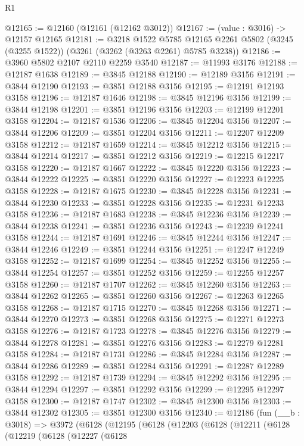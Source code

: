 \begin{lexlean}{R1}
\begin{coremodule}
@12165 := @12160 (@12161 (@12162 @3012))
@12167 := (value : @3016) -> @12157 @12165
@12181 := @3218
    @1522
    @5785
    @12165
    @2261
    @5802
    (@3245 (@3255 @1522))
    (@3261 (@3262 (@3263 @2261) @5785 @3238))
@12186 := @3960 @5802 @2107 @2110 @2259 @3540
@12187 := @11993 @3176
@12188 := @12187 @1638
@12189 := @3845 @12188
@12190 := @12189 @3156
@12191 := @3844 @12190
@12193 := @3851 @12188 @3156
@12195 := @12191 @12193 @3158
@12196 := @12187 @1646
@12198 := @3845 @12196 @3156
@12199 := @3844 @12198
@12201 := @3851 @12196 @3156
@12203 := @12199 @12201 @3158
@12204 := @12187 @1536
@12206 := @3845 @12204 @3156
@12207 := @3844 @12206
@12209 := @3851 @12204 @3156
@12211 := @12207 @12209 @3158
@12212 := @12187 @1659
@12214 := @3845 @12212 @3156
@12215 := @3844 @12214
@12217 := @3851 @12212 @3156
@12219 := @12215 @12217 @3158
@12220 := @12187 @1667
@12222 := @3845 @12220 @3156
@12223 := @3844 @12222
@12225 := @3851 @12220 @3156
@12227 := @12223 @12225 @3158
@12228 := @12187 @1675
@12230 := @3845 @12228 @3156
@12231 := @3844 @12230
@12233 := @3851 @12228 @3156
@12235 := @12231 @12233 @3158
@12236 := @12187 @1683
@12238 := @3845 @12236 @3156
@12239 := @3844 @12238
@12241 := @3851 @12236 @3156
@12243 := @12239 @12241 @3158
@12244 := @12187 @1691
@12246 := @3845 @12244 @3156
@12247 := @3844 @12246
@12249 := @3851 @12244 @3156
@12251 := @12247 @12249 @3158
@12252 := @12187 @1699
@12254 := @3845 @12252 @3156
@12255 := @3844 @12254
@12257 := @3851 @12252 @3156
@12259 := @12255 @12257 @3158
@12260 := @12187 @1707
@12262 := @3845 @12260 @3156
@12263 := @3844 @12262
@12265 := @3851 @12260 @3156
@12267 := @12263 @12265 @3158
@12268 := @12187 @1715
@12270 := @3845 @12268 @3156
@12271 := @3844 @12270
@12273 := @3851 @12268 @3156
@12275 := @12271 @12273 @3158
@12276 := @12187 @1723
@12278 := @3845 @12276 @3156
@12279 := @3844 @12278
@12281 := @3851 @12276 @3156
@12283 := @12279 @12281 @3158
@12284 := @12187 @1731
@12286 := @3845 @12284 @3156
@12287 := @3844 @12286
@12289 := @3851 @12284 @3156
@12291 := @12287 @12289 @3158
@12292 := @12187 @1739
@12294 := @3845 @12292 @3156
@12295 := @3844 @12294
@12297 := @3851 @12292 @3156
@12299 := @12295 @12297 @3158
@12300 := @12187 @1747
@12302 := @3845 @12300 @3156
@12303 := @3844 @12302
@12305 := @3851 @12300 @3156
@12340 := @12186
    (fun (__b : @3018) =>
    @3972
      (@6128
        (@12195
          (@6128
            (@12203
              (@6128
                (@12211
                  (@6128
                    (@12219
                      (@6128
                        (@12227
                          (@6128

\end{coremodule}
\end{lexlean}
